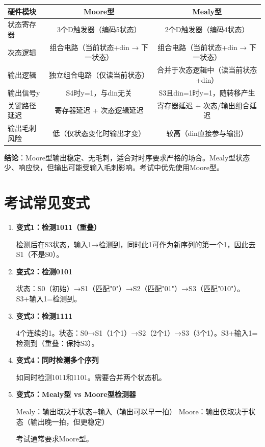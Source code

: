 \begin{center}
\begin{tabular}{|l|c|c|}
\hline
\textbf{硬件模块} & \textbf{Moore型} & \textbf{Mealy型} \\
\hline
状态寄存器 & 3个D触发器（编码5状态）& 2个D触发器（编码4状态）\\
次态逻辑 & 组合电路（当前状态+din → 下一状态）& 组合电路（当前状态+din → 下一状态）\\
输出逻辑 & 独立组合电路（仅读当前状态）& 合并于次态逻辑中（读当前状态+din）\\
输出信号y & S4时y=1，与din无关 & S3且din=1时y=1，随转移产生\\
\hline
关键路径延迟 & 寄存器延迟 + 次态逻辑延迟 & 寄存器延迟 + 次态/输出组合延迟 \\
输出毛刺风险 & 低（仅状态变化时输出才变）& 较高（din直接参与输出）\\
\hline
\end{tabular}
\end{center}

\textbf{结论}：Moore型输出稳定、无毛刺，适合对时序要求严格的场合。Mealy型状态少、响应快，但输出可能受输入毛刺影响。考试中优先使用Moore型。

\section{考试常见变式}

\begin{enumerate}
  \item \textbf{变式1：检测1011（重叠）}

  检测后在S3状态，输入1→检测到，同时此1可作为新序列的第一个1，因此去S1（不是S0）。

  \item \textbf{变式2：检测0101}

  状态：S0（初始）→S1（匹配"0"）→S2（匹配"01"）→S3（匹配"010"）。S3+输入1=检测到。

  \item \textbf{变式3：检测1111}

  4个连续的1。状态：S0→S1（1个1）→S2（2个1）→S3（3个1）。S3+输入1=检测到（重叠：保持S3）。

  \item \textbf{变式4：同时检测多个序列}

  如同时检测1011和1101。需要合并两个状态机。

  \item \textbf{变式5：Mealy型 vs Moore型检测器}

  Mealy：输出取决于状态+输入（输出可以早一拍）
  Moore：输出仅取决于状态（输出晚一拍，但更稳定）

  考试通常要求Moore型。
\end{enumerate}


